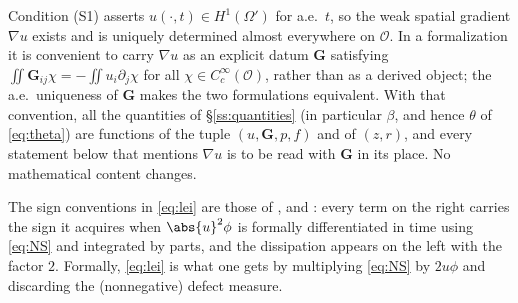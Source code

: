 \documentclass[11pt,reqno]{amsart}
\begin{document}
\begin{remark}\label{rem:gradient-datum}
Condition (S1) asserts $u(\cdot,t)\in H^{1}(\Omega')$ for a.e.\ $t$, so the weak
spatial gradient $\nabla u$ exists and is uniquely determined almost everywhere
on $\mathcal{O}$. In a formalization it is convenient to carry $\nabla u$ as an
explicit datum $\mathbf{G}$ satisfying
$\iint\mathbf{G}_{ij}\chi=-\iint u_{i}\partial_{j}\chi$ for all
$\chi\in C_{c}^{\infty}(\mathcal{O})$, rather than as a derived object; the
a.e.\ uniqueness of $\mathbf{G}$ makes the two formulations equivalent. With
that convention, all the quantities of \S\ref{ss:quantities} (in particular
$\beta$, and hence $\theta$ of \eqref{eq:theta}) are functions of the tuple
$(u,\mathbf{G},p,f)$ and of $(z,r)$, and every statement below that mentions
$\nabla u$ is to be read with $\mathbf{G}$ in its place. No mathematical content
changes.
\end{remark}

The sign conventions in \eqref{eq:lei} are those of \cite{CKN1982},
\cite{Lin1998} and \cite{Kukavica2008}: every term on the right carries the
sign it acquires when $\abs{u}^{2}\phi$ is formally differentiated in time using
\eqref{eq:NS} and integrated by parts, and the dissipation appears on the left
with the factor $2$. Formally, \eqref{eq:lei} is what one gets by multiplying
\eqref{eq:NS} by $2u\phi$ and discarding the (nonnegative) defect measure.
\end{document}
